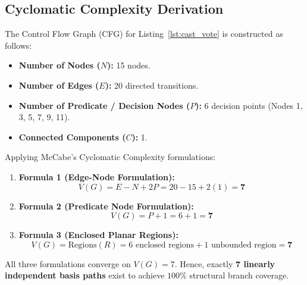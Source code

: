 \documentclass[12pt,a4paper,oneside]{report}
\begin{document}
\subsection{Cyclomatic Complexity Derivation}
The Control Flow Graph (CFG) for Listing~\ref{lst:cast_vote} is constructed as follows:
\begin{itemize}
    \item \textbf{Number of Nodes ($N$):} 15 nodes.
    \item \textbf{Number of Edges ($E$):} 20 directed transitions.
    \item \textbf{Number of Predicate / Decision Nodes ($P$):} 6 decision points (Nodes 1, 3, 5, 7, 9, 11).
    \item \textbf{Connected Components ($C$):} 1.
\end{itemize}

Applying McCabe's Cyclomatic Complexity formulations:
\begin{enumerate}
    \item \textbf{Formula 1 (Edge-Node Formulation):}
    \begin{equation}
        V(G) = E - N + 2P = 20 - 15 + 2(1) = \mathbf{7}
    \end{equation}
    \item \textbf{Formula 2 (Predicate Node Formulation):}
    \begin{equation}
        V(G) = P + 1 = 6 + 1 = \mathbf{7}
    \end{equation}
    \item \textbf{Formula 3 (Enclosed Planar Regions):}
    \begin{equation}
        V(G) = \text{Regions}(R) = 6 \text{ enclosed regions} + 1 \text{ unbounded region} = \mathbf{7}
    \end{equation}
\end{enumerate}
All three formulations converge on $V(G) = 7$. Hence, exactly \textbf{7 linearly independent basis paths} exist to achieve $100\%$ structural branch coverage.
\end{document}

